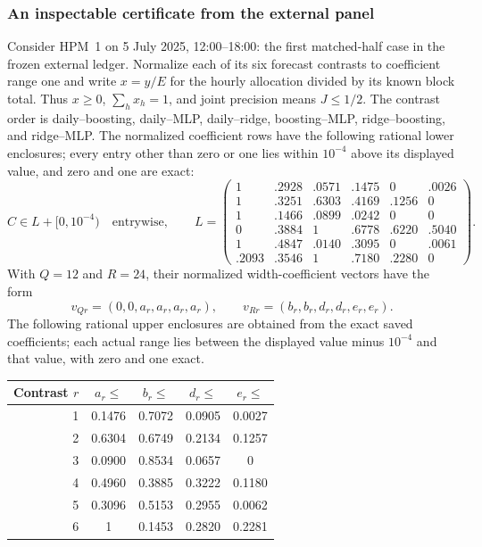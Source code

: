 \documentclass[12pt]{article}
\begin{document}
\subsubsection{An inspectable certificate from the external panel}
\label{sec:worked-joint-certificate}
Consider HPM~1 on 5 July 2025, 12:00--18:00: the first matched-half case
in the frozen external ledger.  Normalize each of its six forecast
contrasts to coefficient range one and write $x=y/E$ for the hourly
allocation divided by its known block total. Thus $x\geq0$, $\sum_hx_h=1$,
and joint precision means $J\leq1/2$. The contrast order is
daily--boosting, daily--MLP, daily--ridge, boosting--MLP,
ridge--boosting, and ridge--MLP.  The normalized coefficient rows have
the following rational lower enclosures; every entry other than zero
or one lies within $10^{-4}$ above its displayed value, and zero and one
are exact:
\[
 C\in L+[0,10^{-4})\quad\text{entrywise},\qquad
 L=\begin{pmatrix}
 1&.2928&.0571&.1475&0&.0026\\
 1&.3251&.6303&.4169&.1256&0\\
 1&.1466&.0899&.0242&0&0\\
 0&.3884&1&.6778&.6220&.5040\\
 1&.4847&.0140&.3095&0&.0061\\
 .2093&.3546&1&.7180&.2280&0
 \end{pmatrix}.
\]
With $Q=12$ and $R=24$, their normalized width-coefficient
vectors have the form
\[
 v_{Qr}=(0,0,a_r,a_r,a_r,a_r),\qquad
 v_{Rr}=(b_r,b_r,d_r,d_r,e_r,e_r).
\]
The following rational upper enclosures are obtained from the exact saved
coefficients; each actual range lies between the displayed value minus
$10^{-4}$ and that value, with zero and one exact.
\begin{center}
\begin{tabular}{rcccc}
\toprule
Contrast $r$&$a_r\leq$&$b_r\leq$&$d_r\leq$&$e_r\leq$\\
\midrule
1&0.1476&0.7072&0.0905&0.0027\\
2&0.6304&0.6749&0.2134&0.1257\\
3&0.0900&0.8534&0.0657&0\\
4&0.4960&0.3885&0.3222&0.1180\\
5&0.3096&0.5153&0.2955&0.0062\\
6&1&0.1453&0.2820&0.2281\\
\bottomrule
\end{tabular}
\end{center}
\end{document}
